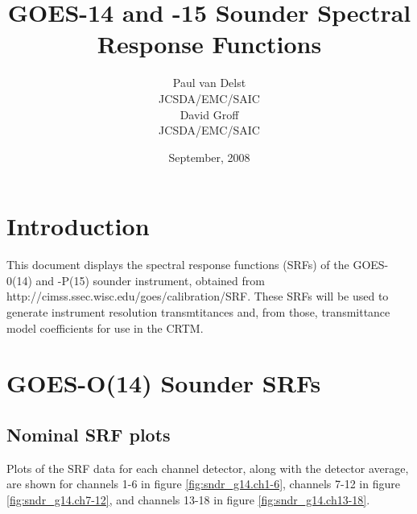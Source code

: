 

\title{GOES-14 and -15 Sounder Spectral Response Functions}
\author{Paul van Delst\\JCSDA/EMC/SAIC\\[0.25in]
        David Groff\\JCSDA/EMC/SAIC}
\date{September, 2008}



\maketitle



\section{Introduction}
This document displays the spectral response functions (SRFs) of the GOES-0(14) and -P(15) sounder instrument, obtained from http://cimss.ssec.wisc.edu/goes/calibration/SRF. These SRFs will be used to generate instrument resolution transmtitances and, from those, transmittance model coefficients for use in the CRTM.


\section{GOES-O(14) Sounder SRFs}

\subsection{Nominal SRF plots}
Plots of the SRF data for each channel detector, along with the detector average, are shown for channels 1-6 in figure \ref{fig:sndr_g14.ch1-6}, channels 7-12 in figure \ref{fig:sndr_g14.ch7-12}, and channels 13-18 in figure \ref{fig:sndr_g14.ch13-18}.


